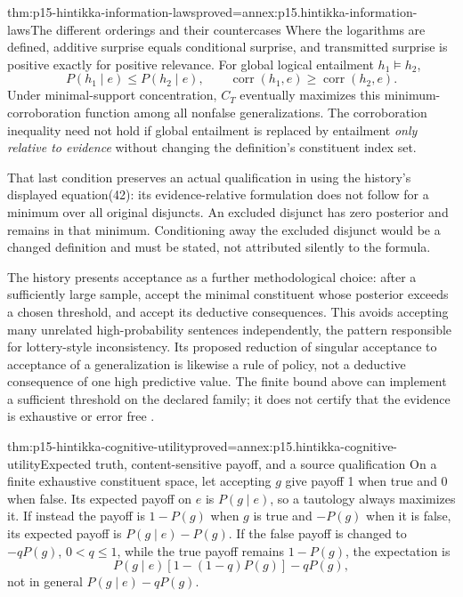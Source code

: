 \begin{hbtheorem}{thm:p15-hintikka-information-laws}{proved=annex:p15.hintikka-information-laws}{The different orderings and their countercases}
Where the logarithms are defined, additive surprise equals conditional
surprise, and transmitted surprise is positive exactly for positive
relevance. For global logical entailment \(h_1\models h_2\),
\[
 P(h_1\mid e)\leq P(h_2\mid e),\qquad
 \operatorname{corr}(h_1,e)\geq\operatorname{corr}(h_2,e).
\]
Under minimal-support concentration, \(C_T\) eventually maximizes
this minimum-corroboration function among all nonfalse generalizations.
The corroboration inequality need not hold if global entailment is
replaced by entailment \emph{only relative to evidence} without changing
the definition's constituent index set.
\end{hbtheorem}

That last condition preserves an actual qualification in using the
history's displayed equation(42): its evidence-relative formulation
does not follow for a minimum over all original disjuncts. An excluded
disjunct has zero posterior and remains in that minimum. Conditioning
away the excluded disjunct would be a changed definition and must be
stated, not attributed silently to the formula.

The history presents acceptance as a further methodological choice:
after a sufficiently large sample, accept the minimal constituent whose
posterior exceeds a chosen threshold, and accept its deductive
consequences. This avoids accepting many unrelated high-probability
sentences independently, the pattern responsible for lottery-style
inconsistency. Its proposed reduction of singular acceptance to
acceptance of a generalization is likewise a rule of policy, not a
deductive consequence of one high predictive value. The finite bound
above can implement a sufficient threshold on the declared family;
it does not certify that the evidence is exhaustive or error free
\cite[secs.~5--7, pp.~329--337]{Niiniluoto2011HintikkaProgramReading}.

\begin{hbtheorem}{thm:p15-hintikka-cognitive-utility}{proved=annex:p15.hintikka-cognitive-utility}{Expected truth, content-sensitive payoff, and a source qualification}
On a finite exhaustive constituent space, let accepting \(g\) give
payoff 1 when true and 0 when false. Its expected payoff on \(e\)
is \(P(g\mid e)\), so a tautology always maximizes it.
If instead the payoff is \(1-P(g)\) when \(g\) is true and
\(-P(g)\) when it is false, its expected payoff is
\(P(g\mid e)-P(g)\).
If the false payoff is changed to \(-qP(g)\),
\(0<q\leq1\), while the true payoff remains \(1-P(g)\),
the expectation is
\[
 P(g\mid e)[1-(1-q)P(g)]-qP(g),
\]
not in general \(P(g\mid e)-qP(g)\).
\end{hbtheorem}

